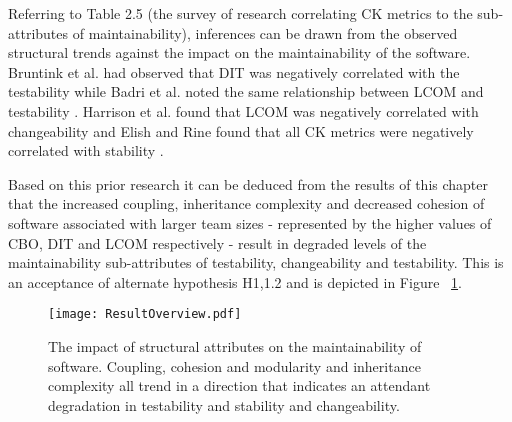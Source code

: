 Referring to Table 2.5 (the survey of research correlating CK metrics to the sub-attributes of maintainability), inferences can be drawn from the observed structural trends against the impact on the maintainability of the software. Bruntink et al. had observed that DIT was negatively correlated with the testability while Badri et al. noted the same relationship between LCOM and testability \citep{bruntink2006empirical, badri2011empirical}. Harrison et al. found that LCOM was negatively correlated with changeability and Elish and Rine found that all CK metrics were negatively correlated with stability \citep{harrison1998investigation, elish2003investigation}.

Based on this prior research it can be deduced from the results of this chapter that the increased coupling, inheritance complexity and decreased cohesion of software associated with larger team sizes - represented by the higher values of CBO, DIT and LCOM respectively - result in degraded levels of the maintainability sub-attributes of testability, changeability and testability. This is an acceptance of alternate hypothesis H1,1.2 and is depicted in Figure ~\ref{fig:ResultOverview}.

\begin{figure}[htbp!] 
\centering    
\texttt{[image: ResultOverview.pdf]}
\caption[The impact of internal attributes on the maintainability of software.]{The impact of structural attributes on the maintainability of software. Coupling, cohesion and modularity and inheritance complexity all trend in a direction that indicates an attendant degradation in testability and stability and changeability.}
\label{fig:ResultOverview}
\end{figure} 
 
 